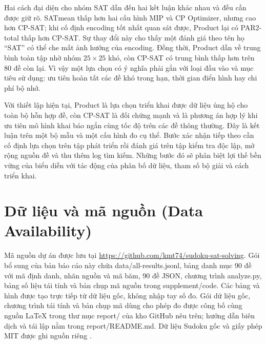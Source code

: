 \documentclass[a4paper]{cas-sc}
\newcommand{\code}[1]{{\rmfamily #1}}
\begin{document}
Hai cách đại diện cho nhóm SAT dẫn đến hai kết luận khác nhau và đều cần được giữ rõ. SATmean thấp hơn hai cấu hình MIP và CP Optimizer, nhưng cao hơn CP-SAT; khi cố định encoding tốt nhất quan sát được, Product lại có PAR2-total thấp hơn CP-SAT. Sự thay đổi này cho thấy một đánh giá theo tên họ ``SAT'' có thể che mất ảnh hưởng của encoding. Đồng thời, Product dẫn về trung bình toàn tập nhờ nhóm $25\times25$ khó, còn CP-SAT có trung bình thấp hơn trên 80 đề còn lại. Vì vậy một lựa chọn có ý nghĩa phải gắn với loại đầu vào và mục tiêu sử dụng: ưu tiên hoàn tất các đề khó trong hạn, thời gian điển hình hay chi phí bộ nhớ.

Với thiết lập hiện tại, Product là lựa chọn triển khai được dữ liệu ủng hộ cho toàn bộ hỗn hợp đề, còn CP-SAT là đối chứng mạnh và là phương án hợp lý khi ưu tiên mô hình khai báo ngắn cùng tốc độ trên các đề thông thường. Đây là kết luận trên một bộ mẫu và một cấu hình đo cụ thể. Bước xác nhận tiếp theo cần cố định lựa chọn trên tập phát triển rồi đánh giá trên tập kiểm tra độc lập, mở rộng nguồn đề và thu thêm log tìm kiếm. Những bước đó sẽ phân biệt lợi thế bền vững của biểu diễn với tác động của phân bố dữ liệu, tham số bộ giải và cách triển khai.

\section*{Dữ liệu và mã nguồn (Data Availability)}
Mã nguồn dự án được lưu tại \url{https://github.com/kmt74/sudoku-sat-solving}. Gói bổ sung của bản báo cáo này chứa \code{data/all-results.jsonl}, bảng danh mục 90 đề với mã định danh, nhãn nguồn và mã băm, 90 đề JSON, chương trình \code{analyze.py}, bảng số liệu tái tính và bản chụp mã nguồn trong \code{supplement/code}. Các bảng và hình được tạo trực tiếp từ dữ liệu gốc, không nhập tay số đo. Gói dữ liệu gốc, chương trình tái tính và bản chụp mã dùng cho phép đo được công bố cùng nguồn LaTeX trong thư mục \code{report/} của kho GitHub nêu trên; hướng dẫn biên dịch và tái lập nằm trong \code{report/README.md}. Dữ liệu Sudoku gốc và giấy phép MIT được ghi nguồn riêng \citep{corpus}.



\end{document}
